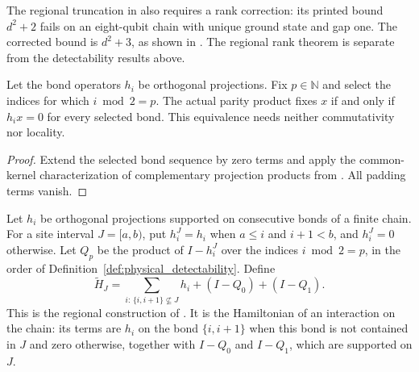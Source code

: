 The regional truncation in \cite{Arad2016RigorousRG} also requires a rank
correction: its printed bound $d^2+2$ fails on an eight-qubit chain with
unique ground state and gap one. The corrected bound is $d^2+3$, as
shown in \cite{gap:alvv16_frustration_free_truncation_rank}. The regional
rank theorem is separate from the detectability results above.

\begin{lemma}
    \label{thm:physical_parity_product_fixed_space}
    \leanok
    Let the bond operators $h_i$ be orthogonal projections. Fix $p\in\mathbb N$
    and select the indices for which $i\bmod2=p$. The actual parity product
    fixes $x$ if and only if $h_ix=0$ for every selected bond.
    This equivalence needs neither commutativity nor locality.
\end{lemma}
\begin{proof}\leanok
    Extend the selected bond sequence by zero terms and apply the
    common-kernel characterization of complementary projection products
    from \cite{QICLean2026Blueprint}. All padding terms vanish.
\end{proof}

\begin{definition}
    \label{def:physical_ff_regional_truncation}
    \leanok
    Let $h_i$ be orthogonal projections supported on consecutive bonds
    of a finite chain. For a site interval $J=[a,b)$, put
    $h_i^J=h_i$ when $a\le i$ and $i+1<b$, and $h_i^J=0$ otherwise.
    Let $Q_p$ be the product of $I-h_i^J$ over the indices
    $i\bmod2=p$, in the order of Definition~\ref{def:physical_detectability}.
    Define
    \[
        \widetilde H_J=
        \sum_{i:\,\{i,i+1\}\not\subseteq J}h_i+(I-Q_0)+(I-Q_1).
    \]
    This is the regional construction of
    \cite[Section 6.1]{Arad2016RigorousRG}.
    It is the Hamiltonian of an interaction on the chain: its terms are
    $h_i$ on the bond $\{i,i+1\}$ when this bond is not contained in $J$
    and zero otherwise, together with $I-Q_0$ and $I-Q_1$, which are
    supported on $J$.
\end{definition}

